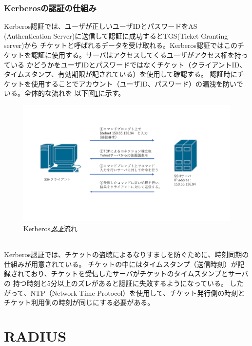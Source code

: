 \documentclass[11pt,a4j,titlepage]{jreport}
\begin{document}
\subsubsection*{Kerberosの認証の仕組み}
Kerberos認証では、ユーザが正しいユーザIDとパスワードをAS\\(Authentication Server)に送信して認証に成功するとTGS(Ticket Granting server)から
チケットと呼ばれるデータを受け取れる。Kerberos認証ではこのチケットを認証に使用する。サーバはアクセスしてくるユーザがアクセス権を持っている
かどうかをユーザIDとパスワードではなくチケット（クライアントID、タイムスタンプ、有効期限が記されている）を使用して確認する。
認証時にチケットを使用することでアカウント（ユーザID、パスワード）の漏洩を防いでいる。全体的な流れを
以下図\ref{KerberosAuthority}に示す。
\begin{figure}[h]
    \begin{flushleft}
        \includegraphics[width=1.0\textwidth, page=12]{graphs/network_archtecture.pdf}
        \caption{Kerberos認証流れ}
        \label{KerberosAuthority}
    \end{flushleft}
\end{figure}\\
Kerberos認証では、チケットの盗聴によるなりすましを防ぐために、時刻同期の仕組みが用意されている。
チケットの中にはタイムスタンプ（送信時刻）が記録されており、チケットを受信したサーバがチケットのタイムスタンプとサーバの
持つ時刻と5分以上のズレがあると認証に失敗するようになっている。
したがって、NTP（Network Time Protocol）を使用して、チケット発行側の時刻とチケット利用側の時刻が同じにする必要がある。
\clearpage

\section{RADIUS}
\end{document}
